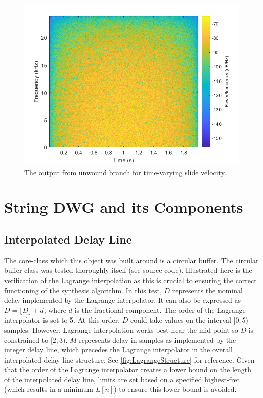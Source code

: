 \documentclass[../main.tex]{subfiles}
\begin{document}
\begin{figure}[h]
    \centering
    \includegraphics[scale=.65]{./images/plots/CSG_Unwound_TV.png}
    \caption{The output from unwound branch for time-varying slide velocity.}
    \label{fig:CSGUnwoundTVSpec}
\end{figure}

\section{String DWG and its Components}

\subsection{Interpolated Delay Line}
The core-class which this object was built around is a circular buffer. The circular buffer class was tested thoroughly itself (see source code). Illustrated here is the verification of the Lagrange interpolation as this is crucial to ensuring the correct functioning of the synthesis algorithm. In this test, $D$ represents the nominal delay implemented by the Lagrange interpolator. It can also be expressed as $D = \lfloor D \rfloor + d$, where $d$ is the fractional component. The order of the Lagrange interpolator is set to 5. At this order, $D$ could take values on the interval $[0,5)$ samples. However, Lagrange interpolation works best near the mid-point so $D$ is constrained to $[2, 3)$. $M$ represents delay in samples as implemented by the integer delay line, which precedes the Lagrange interpolator in the overall interpolated delay line structure. See \ref{fig:LagrangeStructure} for reference. Given that the order of the Lagrange interpolator creates a lower bound on the length of the interpolated delay line, limits are set based on a specified highest-fret (which results in a minimum $L[n]$) to ensure this lower bound is avoided.
\end{document}
